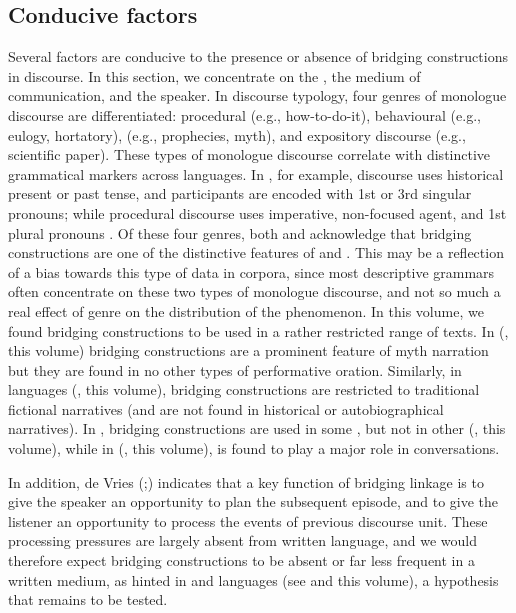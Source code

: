 \documentclass[output=paper]{LSP/langsci}
\begin{document}
\subsection{Conducive factors} 
\label{GuAi41conducive}
Several factors are conducive to the presence or absence of bridging constructions in discourse. In this section, we concentrate on the , the medium of communication, and the speaker. 
In  discourse typology, four genres of monologue discourse are differentiated: procedural (e.g., how-to-do-it), behavioural (e.g., eulogy, hortatory),  (e.g., prophecies, myth), and expository discourse (e.g., scientific paper). These types of monologue discourse correlate with distinctive grammatical markers across languages. In , for example,  discourse uses historical present or past tense, and participants are encoded with 1st or 3rd singular pronouns; while procedural discourse uses imperative, non-focused agent, and 1st plural pronouns \citep[][3--17]{longacre83}. Of these four genres, both \citet[][9]{longacre83} and \citet[][365]{devries.2005} acknowledge that bridging constructions are one of the distinctive features of  and . This may be a reflection of a bias towards this type of data in corpora, since most descriptive grammars often concentrate on these two types of monologue discourse, and not so much a real effect of genre on the distribution of the phenomenon. In this volume, we found bridging constructions to be used in a rather restricted range of texts. In  (\citeauthor{emlen18}, this volume) bridging constructions are a prominent feature of myth narration but they are found in no other types of performative oration. Similarly, in  languages (\citeauthor{anker18}, this volume), bridging constructions are restricted to traditional fictional narratives (and are not found in historical or autobiographical narratives). In , bridging constructions are used in some , but not in other  (\citeauthor{sarvasy18}, this volume), while in  (\citeauthor{alvanoudi18}, this volume),  is found to play a major  role in conversations. 

In addition, de Vries (\citeyear[][378]{devries.2005};\citeyear[][817]{devries.2006}) indicates that a key function of bridging linkage is to give the speaker an opportunity to plan the subsequent  episode, and to give the listener an opportunity to process the events of previous discourse unit.  These processing pressures are largely absent from written language, and we would therefore expect bridging constructions to be absent or far less frequent in a written medium, as hinted in  and  languages (see \citeauthor{emlen18} and \citeauthor{anker18} this volume), a hypothesis that remains to be tested.
\end{document}
